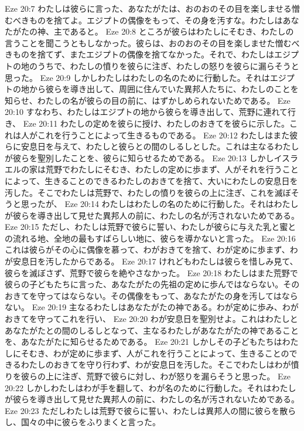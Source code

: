 Eze 20:7  わたしは彼らに言った、あなたがたは、おのおのその目を楽しませる憎むべきものを捨てよ。エジプトの偶像をもって、その身を汚すな。わたしはあなたがたの神、主であると。
Eze 20:8  ところが彼らはわたしにそむき、わたしの言うことを聞こうともしなかった。彼らは、おのおのその目を楽しませた憎むべきものを捨てず、またエジプトの偶像を捨てなかった。それで、わたしはエジプトの地のうちで、わたしの憤りを彼らに注ぎ、わたしの怒りを彼らに漏らそうと思った。
Eze 20:9  しかしわたしはわたしの名のために行動した。それはエジプトの地から彼らを導き出して、周囲に住んでいた異邦人たちに、わたしのことを知らせ、わたしの名が彼らの目の前に、はずかしめられないためである。
Eze 20:10  すなわち、わたしはエジプトの地から彼らを導き出して、荒野に連れて行き、
Eze 20:11  わたしの定めを彼らに授け、わたしのおきてを彼らに示した。これは人がこれを行うことによって生きるものである。
Eze 20:12  わたしはまた彼らに安息日を与えて、わたしと彼らとの間のしるしとした。これは主なるわたしが彼らを聖別したことを、彼らに知らせるためである。
Eze 20:13  しかしイスラエルの家は荒野でわたしにそむき、わたしの定めに歩まず、人がそれを行うことによって、生きることのできるわたしのおきてを捨て、大いにわたしの安息日を汚した。そこでわたしは荒野で、わたしの憤りを彼らの上に注ぎ、これを滅ぼそうと思ったが、
Eze 20:14  わたしはわたしの名のために行動した。それはわたしが彼らを導き出して見せた異邦人の前に、わたしの名が汚されないためである。
Eze 20:15  ただし、わたしは荒野で彼らに誓い、わたしが彼らに与えた乳と蜜との流れる地、全地の最もすばらしい地に、彼らを導かないと言った。
Eze 20:16  これは彼らがその心に偶像を慕って、わがおきてを捨て、わが定めに歩まず、わが安息日を汚したからである。
Eze 20:17  けれどもわたしは彼らを惜しみ見て、彼らを滅ぼさず、荒野で彼らを絶やさなかった。
Eze 20:18  わたしはまた荒野で彼らの子どもたちに言った、あなたがたの先祖の定めに歩んではならない。そのおきてを守ってはならない。その偶像をもって、あなたがたの身を汚してはならない。
Eze 20:19  主なるわたしはあなたがたの神である。わが定めに歩み、わがおきてを守ってこれを行い、
Eze 20:20  わが安息日を聖別せよ。これはわたしとあなたがたとの間のしるしとなって、主なるわたしがあなたがたの神であることを、あなたがたに知らせるためである。
Eze 20:21  しかしその子どもたちはわたしにそむき、わが定めに歩まず、人がこれを行うことによって、生きることのできるわたしのおきてを守り行わず、わが安息日を汚した。そこでわたしはわが憤りを彼らの上に注ぎ、荒野で彼らに対し、わが怒りを漏らそうと思った。
Eze 20:22  しかしわたしはわが手を翻して、わが名のために行動した。それはわたしが彼らを導き出して見せた異邦人の前に、わたしの名が汚されないためである。
Eze 20:23  ただしわたしは荒野で彼らに誓い、わたしは異邦人の間に彼らを散らし、国々の中に彼らをふりまくと言った。
